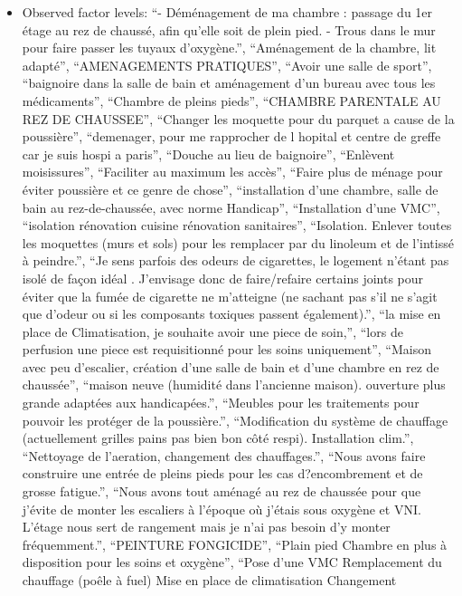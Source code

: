 \documentclass[
  letterpaper,
  DIV=11,
  numbers=noendperiod]{scrartcl}
\providecommand{\tightlist}{%
  \setlength{\itemsep}{0pt}\setlength{\parskip}{0pt}}
\begin{document}
\begin{itemize}
\tightlist
\item
  Observed factor levels: ``- Déménagement de ma chambre : passage du
  1er étage au rez de chaussé, afin qu'elle soit de plein pied. - Trous
  dans le mur pour faire passer les tuyaux d'oxygène.'', ``Aménagement
  de la chambre, lit adapté'', ``AMENAGEMENTS PRATIQUES'', ``Avoir une
  salle de sport'', ``baignoire dans la salle de bain et aménagement
  d'un bureau avec tous les médicaments'', ``Chambre de pleins pieds'',
  ``CHAMBRE PARENTALE AU REZ DE CHAUSSEE'', ``Changer les moquette pour
  du parquet a cause de la poussière'', ``demenager, pour me rapprocher
  de l hopital et centre de greffe car je suis hospi a paris'', ``Douche
  au lieu de baignoire'', ``Enlèvent moisissures'', ``Faciliter au
  maximum les accès'', ``Faire plus de ménage pour éviter poussière et
  ce genre de chose'', ``installation d'une chambre, salle de bain au
  rez-de-chaussée, avec norme Handicap'', ``Installation d'une VMC'',
  ``isolation rénovation cuisine rénovation sanitaires'', ``Isolation.
  Enlever toutes les moquettes (murs et sols) pour les remplacer par du
  linoleum et de l'intissé à peindre.'', ``Je sens parfois des odeurs de
  cigarettes, le logement n'étant pas isolé de façon idéal . J'envisage
  donc de faire/refaire certains joints pour éviter que la fumée de
  cigarette ne m'atteigne (ne sachant pas s'il ne s'agit que d'odeur ou
  si les composants toxiques passent également).'', ``la mise en place
  de Climatisation, je souhaite avoir une piece de soin,'', ``lors de
  perfusion une piece est requisitionné pour les soins uniquement'',
  ``Maison avec peu d'escalier, création d'une salle de bain et d'une
  chambre en rez de chaussée'', ``maison neuve (humidité dans l'ancienne
  maison). ouverture plus grande adaptées aux handicapées.'', ``Meubles
  pour les traitements pour pouvoir les protéger de la poussière.'',
  ``Modification du système de chauffage (actuellement grilles pains pas
  bien bon côté respi). Installation clim.'', ``Nettoyage de l'aeration,
  changement des chauffages.'', ``Nous avons faire construire une entrée
  de pleins pieds pour les cas d?encombrement et de grosse fatigue.'',
  ``Nous avons tout aménagé au rez de chaussée pour que j'évite de
  monter les escaliers à l'époque où j'étais sous oxygène et VNI.
  L'étage nous sert de rangement mais je n'ai pas besoin d'y monter
  fréquemment.'', ``PEINTURE FONGICIDE'', ``Plain pied Chambre en plus à
  disposition pour les soins et oxygène'', ``Pose d'une VMC Remplacement
  du chauffage (poêle à fuel) Mise en place de climatisation Changement

\end{itemize}
\end{document}
